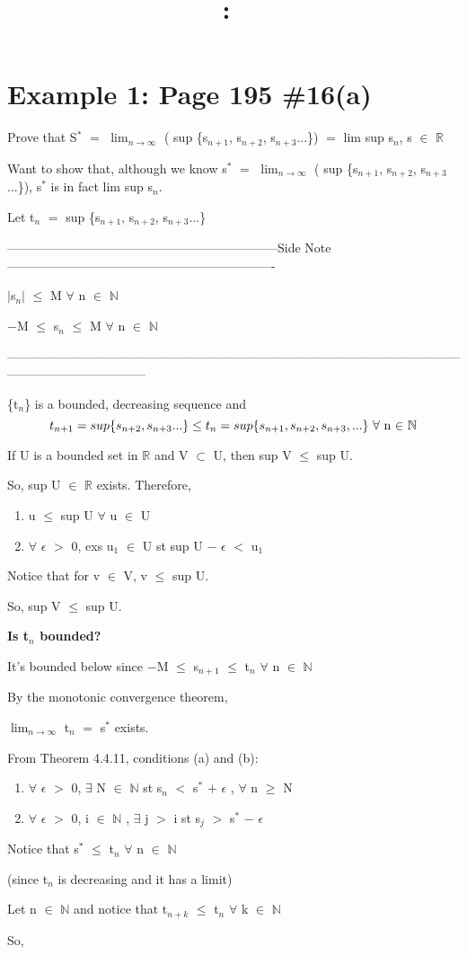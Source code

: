 \documentclass{article}
\title{
    \vspace{2in}
    \textmd{\textbf{\hmwkClass:\ \hmwkTitle}}\\
    \normalsize\vspace{0.1in}\small\vspace{0.1in}\large{\textit{\hmwkClassInstructor}}
    \vspace{3in}
}
\author{\hmwkAuthorName}
\date{}
\newcommand{\mt}[1]{\ensuremath{#1}}
\newcommand\bsc[2][\DefaultOpt]{%
  \def\DefaultOpt{#2}%
  \section[#1]{#2}%
}
\newcommand{\balist}{\begin{enumerate}[label=\alph*.]}
\newcommand{\elist}{\end{enumerate}}
\newcommand{\bilist}{\begin{enumerate}[label=\roman*)]}
\newcommand{\sidenote}[1]{-----------------------------------------------------------------Side Note----------------------------------------------------------------
#1 \

---------------------------------------------------------------------------------------------------------------------------------------------}
\newcommand{\br}{\mt{\mathbb{R}} }       %
\newcommand{\bn}{\mt{\mathbb{N}} }       %
\newcommand{\ep}{\mt{\epsilon} }         %
\newcommand{\fa}{\mt{\forall} }          %
\newcommand{\mem}{\mt{\in} }
\newcommand{\exs}{\mt{\exists} }
\newcommand{\sbs}{\mt{\subset} }         %
\newcommand{\av}[1]{\mt{|}#1\mt{|}}  %
\newcommand{\bk}[1]{\{#1\}}
\newcommand{\ps}{\mt{+} }
\newcommand{\ms}{\mt{-} }
\newcommand{\ls}{\mt{<} }
\newcommand{\gr}{\mt{>} }
\newcommand{\lse}{\mt{\leq} }
\newcommand{\gre}{\mt{\geq} }
\newcommand{\eql}{\mt{=} }
\newcommand{\uw}[2]{#1\mt{_{#2}}}
\newcommand{\uf}[2]{#1\mt{^{#2}}}
\newcommand{\lmti}[1]{\mt{\displaystyle{\lim_{#1 \to \infty}}}}
\newcommand{\eqn}[1]{\[#1\]}
\begin{document}
\bsc{Example 1: Page 195 \#16(a)}{

Prove that \uf{S}{*} \eql \lmti{n} ( sup \bk{\uw{s}{n + 1}, \uw{s}{n + 2}, \uw{s}{n + 3}...}) \eql lim sup \uw{s}{n}, s \mem \br

Want to show that, although we know \uf{s}{*} \eql \lmti{n} ( sup \bk{\uw{s}{n + 1}, \uw{s}{n + 2}, \uw{s}{n + 3}...}), \uf{s}{*} is in fact lim sup \uw{s}{n}.

Let \uw{t}{n} \eql sup \bk{\uw{s}{n + 1}, \uw{s}{n + 2}, \uw{s}{n + 3}...}

\sidenote{
\av{\uw{s}{n}} \lse M \fa n \mem \bn

$-$M \lse \uw{s}{n} \lse M \fa n \mem \bn
}

\bk{\uw{t}{n}} is a bounded, decreasing sequence and
\eqn{t_{n + 1} = sup \bk{s_{n + 2}, s_{n + 3}...} \lse t_n = sup \bk{\uw{s}{n + 1}, \uw{s}{n + 2}, \uw{s}{n + 3}, ...} \textrm{ \fa n \mem } \bn}

If U is a bounded set in \br and V \sbs U, then sup V \lse sup U.

So, sup U \mem \br exists. Therefore,

\bilist
\item u \lse sup U \fa u \mem U
\item \fa \ep \gr 0, exs \uw{u}{1} \mem U st sup U \ms \ep \ls \uw{u}{1}
\elist

Notice that for v \mem V, v \lse sup U.

So, sup V \lse sup U.

\textbf{Is \uw{t}{n} bounded?}

It's bounded below since $-$M \lse \uw{s}{n + 1} \lse \uw{t}{n} \fa n \mem \bn

By the monotonic convergence theorem,

\lmti{n} \uw{t}{n} \eql \uf{s}{*} exists.

From Theorem 4.4.11, conditions (a) and (b):

\balist
\item \fa \ep \gr 0, \exs N \mem \bn st \uw{s}{n} \ls \uf{s}{*} \ps \ep, \fa n \gre N
\item \fa \ep \gr 0, i \mem \bn, \exs j \gr i st \uw{s}{j} \gr \uf{s}{*} \ms \ep
\elist

Notice that \uf{s}{*} \lse \uw{t}{n} \fa n \mem \bn

(since \uw{t}{n} is decreasing and it has a limit)

Let n \mem \bn and notice that \uw{t}{n + k} \lse \uw{t}{n} \fa k \mem \bn

So, 

}
\end{document}

